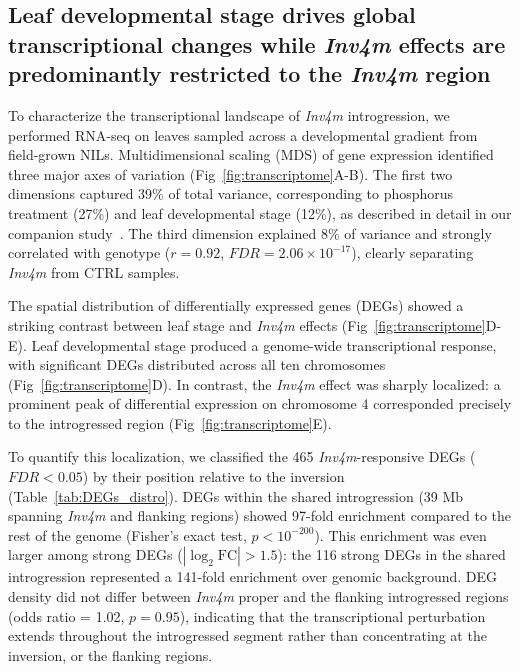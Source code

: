 \documentclass[9pt,twocolumn,twoside]{rilabRxiv}
\newcommand{\invfour}{\textit{Inv4m}\xspace}
\begin{document}


\subsection*{Leaf developmental stage drives global transcriptional changes while \invfour effects are predominantly restricted to the \invfour region}

To characterize the transcriptional landscape of \invfour introgression, we performed RNA-seq on leaves sampled across a developmental gradient from field-grown NILs.
Multidimensional scaling (MDS) of gene expression identified three major axes of variation (Fig~\ref{fig:transcriptome}A-B).
The first two dimensions captured 39\% of total variance, corresponding to phosphorus treatment (27\%) and leaf developmental stage (12\%), as described in detail in our companion study~\cite{rodriguez2026phosphorus}.
The third dimension explained 8\% of variance and strongly correlated with genotype ($r = 0.92$, $\textit{FDR} = 2.06 \times 10^{-17}$), clearly separating \invfour from CTRL samples.

The spatial distribution of differentially expressed genes (DEGs) showed a striking contrast between leaf stage and \invfour effects (Fig~\ref{fig:transcriptome}D-E).
Leaf developmental stage produced a genome-wide transcriptional response, with significant DEGs distributed across all ten chromosomes (Fig~\ref{fig:transcriptome}D).
In contrast, the \invfour effect was sharply localized: a prominent peak of differential expression on chromosome 4 corresponded precisely to the introgressed region (Fig~\ref{fig:transcriptome}E).

To quantify this localization, we classified the 465 \invfour-responsive DEGs ($\textit{FDR} < 0.05$) by their position relative to the inversion (Table~\ref{tab:DEGs_distro}).
DEGs within the shared introgression (39 Mb spanning \invfour and flanking regions) showed 97-fold enrichment compared to the rest of the genome (Fisher's exact test, $p < 10^{-200}$).
This enrichment was even larger among strong DEGs ($|\log_2 \text{FC}| > 1.5$): the 116 strong DEGs in the shared introgression represented a 141-fold enrichment over genomic background.
DEG density did not differ between \invfour proper and the flanking introgressed regions (odds ratio = 1.02, $p = 0.95$), indicating that the transcriptional perturbation extends throughout the introgressed segment rather than concentrating at the inversion, or the flanking regions.
\end{document}
